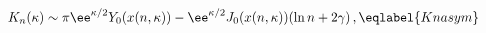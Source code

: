 \begin{equation}
\qquad\;
K_n(\kappa) \sim \pi\ee^{\kappa/2}Y_0(x(n,\kappa))
-\ee^{\kappa/2} J_0(x(n,\kappa)) (\ln n+2\gamma)\,,
\eqlabel{Knasym}
\end{equation}

